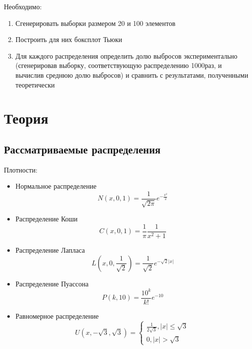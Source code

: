 \documentclass[12pt,a4paper]{article}
\begin{document}
Необходимо:
\begin{enumerate}
    \item Сгенерировать выборки размером 20 и 100 элементов
    \item Построить для них боксплот Тьюки 
    \item Для каждого распределения определить долю выбросов экспериментально (сгенерировав выборку, соответствующую распределению 1000раз, и вычислив среднюю долю выбросов) и сравнить с результатами, полученными теоретически
\end{enumerate}

\section{Теория}
\subsection{Рассматриваемые распределения}
Плотности:
\begin{itemize}
		\item Нормальное распределение
		    \begin{equation}
			    N(x,0,1)=\frac{1}{\sqrt{2\pi}}e^{-\frac{x^2}{2}}
			    \label{normal} 
			\end{equation}
		\item Распределение Коши
		    \begin{equation}
				C(x,0,1)=\frac{1}{\pi}\frac{1}{x^2+1}
				\label{cauchy}
			\end{equation} 
		\item Распределение Лапласа
		    \begin{equation}
				L(x,0,\frac{1}{\sqrt{2}})=\frac{1}{\sqrt{2}}e^{-\sqrt{2}|x|}
				\label{laplace} 
			\end{equation}
		\item Распределение Пуассона
		    \begin{equation}
				P(k,10)=\frac{10^k}{k!}e^{-10}
				\label{poisson}
			\end{equation}
		\item Равномерное распределение
		    \begin{equation}
				U(x,-\sqrt{3},\sqrt{3})=
				\begin{cases}
					\frac{1}{2\sqrt{3}},|x|\leq\sqrt{3}\\0,|x|>\sqrt{3}
				\end{cases}
				\label{uniform}
			\end{equation}
\end{itemize}
\end{document}
